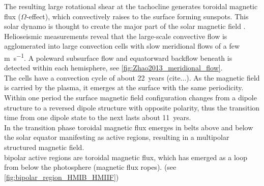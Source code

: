 The resulting large rotational shear at the tachocline generates toroidal magnetic flux ($\Omega$-effect), which convectively raises to the surface forming sunspots. This solar dynamo is thought to create the major part of the solar magnetic field \citep{Miesch2005}.\\	%

Helioseismic measurements reveal that the large-scale convective flow is agglomerated into large convection cells with slow meridional flows of a few \si{\m\per\s}. A poleward subsurface flow and equatorward backflow beneath is detected within each hemisphere, see \autoref{fig:Zhao2013_meridional_flow}.\\

The cells have a convection cycle of about 22~years (cite...). As the magnetic field is carried by the plasma, it emerges at the surface with the same periodicity. Within one period the surface magnetic field configuration changes from a dipole structure to a reversed dipole structure with opposite polarity, thus the transition time from one dipole state to the next lasts about 11~years.\\

In the transition phase toroidal magnetic flux emerges in belts above and below the solar equator manifesting as active regions, resulting in a multipolar structured magnetic field.\\

bipolar active regions are toroidal magnetic flux, which has emerged as a loop from below the photosphere (magnetic flux ropes). (see \autoref{fig:bipolar_region_HMIB_HMIIF})\\
\begin{figure}[htb]
\end{figure}


